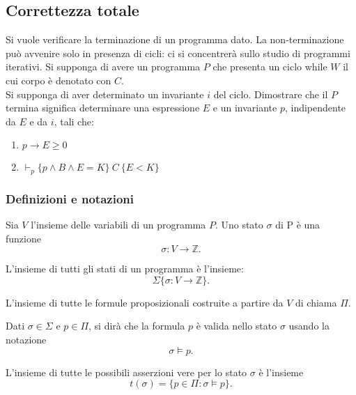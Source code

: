 \documentclass[11pt,a4paper]{article}
\begin{document}
\begin{prooftree}
\end{prooftree}
\newpage
\subsection{Correttezza totale}
Si vuole verificare la terminazione di un programma dato. La non-terminazione pu\`o avvenire solo in presenza di cicli: ci si concentrer\`a sullo studio di programmi iterativi.
Si supponga di avere un programma $P$ che presenta un ciclo while $W$ il cui corpo \`e denotato con $C$. \\
Si supponga di aver determinato un invariante $i$ del ciclo. Dimostrare che il $P$ termina significa determinare una espressione $E$ e un invariante $p$, indipendente da $E$ e da $i$, tali che:
\begin{enumerate}
	\item $ p \rightarrow E \geq 0$
	\item $ \vdash_p \{ p \land B \land E=K  \}\ C\ \{E < K\}   $
\end{enumerate}

\subsubsection{Definizioni e notazioni}
\begin{deff}
	Sia $V$ l'insieme delle variabili di un programma $P$. Uno stato $\sigma$ di P \`e una funzione $$\sigma: V \rightarrow \mathbb{Z}.$$
\end{deff}

\begin{deff}
	L'insieme di tutti gli stati di un programma \`e l'insieme: $$\Sigma \{\sigma:V\rightarrow \mathbb{Z}\}.$$
\end{deff}

\begin{deff}
	L'insieme di tutte le formule proposizionali costruite a partire da $V$ di chiama $\Pi$.
\end{deff}

Dati $\sigma \in \Sigma$ e $ p \in \Pi$, si dir\`a che la formula $p$ \`e valida nello stato $\sigma$ usando la notazione $$\sigma \models p.$$

\begin{deff}
	L'insieme di tutte le possibili asserzioni vere per lo stato $\sigma$ \`e l'insieme $$t(\sigma)=\{p \in \Pi : \sigma \models p\}.$$
\end{deff}
\end{document}
